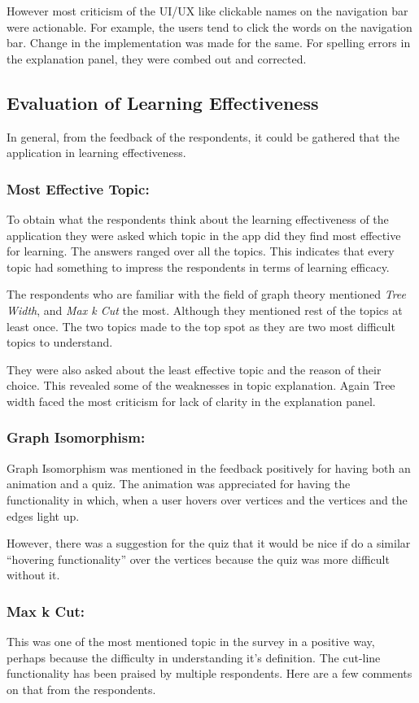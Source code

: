 However most criticism of the UI/UX like clickable names on the navigation bar
were actionable.  For example, the users tend to click the words on the
navigation bar. Change in the implementation was made for the same. For
spelling errors in the explanation panel, they were combed out and corrected.


\subsection{Evaluation of Learning Effectiveness}
In general, from the feedback of the respondents, it could be gathered
that the application in learning effectiveness.

\subsubsection{Most Effective Topic:}
To obtain what the respondents think about the learning effectiveness of the
application they were asked which topic in the app did they find most effective
for learning. The answers ranged over all the topics. This indicates that every
topic had something to impress the respondents in terms of learning efficacy.


The respondents who are familiar with the field of graph theory mentioned
\emph{Tree Width}, and \emph{Max k Cut} the most. Although they mentioned rest
of the topics at least once. The two topics made to the top spot as they are
two most difficult topics to understand.

They were also asked about the least effective topic and the reason of their choice. 
This revealed some of the weaknesses in topic explanation. Again Tree width
faced the most criticism for lack of clarity in the explanation panel. 

\subsubsection{Graph Isomorphism:}
Graph Isomorphism was mentioned in the feedback positively for having both an
animation and a quiz. The animation was appreciated for having the
functionality in which, when a user hovers over vertices and the vertices and
the edges light up. 

However, there was a suggestion for the quiz 
that it would be nice if do a similar ``hovering functionality'' over the
vertices because the quiz was more difficult without it.

\subsubsection{Max k Cut:}
This was one of the most mentioned topic in the survey in a positive way,
perhaps because the difficulty in understanding it's definition. The cut-line
functionality has been praised by multiple respondents. Here are a few
comments on that from the respondents.

